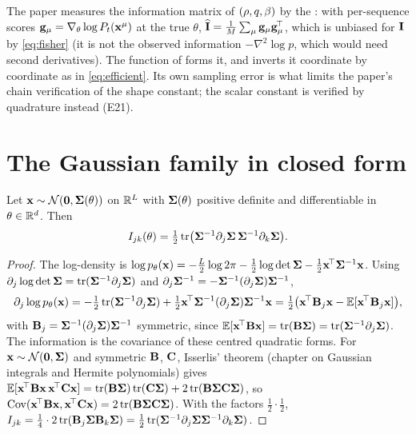 The paper measures the information matrix of $(\rho,q,\beta)$ by the
: with per-sequence scores $\mathbf{g}_\mu=\nabla_\theta\log P_t(\mathbf{x}^\mu)$
at the true $\theta$, $\widehat{\mathbf{I}}=\tfrac1{M}\sum_\mu\mathbf{g}_\mu\mathbf{g}_\mu^{\!\top}$,
which is unbiased for $\mathbf{I}$ by \cref{eq:fisher} (it is not the observed
information $-\nabla^2\log p$, which would need second derivatives). The function
 of  forms it,
and  inverts it coordinate by coordinate as in
\cref{eq:efficient}. Its own sampling error is what limits the paper's chain
verification of the shape constant; the scalar constant is verified by quadrature
instead (E21).

\section{The Gaussian family in closed form}
\label{sec:gaussian-fisher}

\begin{proposition}
\label{prop:gaussian-fisher}
Let $\mathbf{x}\sim\mathcal{N}\!\left(\mathbf{0},\mathbf{\Sigma}(\theta)\right)$ on $\mathbb{R}^{L}$ with $\mathbf{\Sigma}(\theta)$
positive definite and differentiable in $\theta\in\mathbb{R}^d$. Then
\begin{equation}
  I_{jk}(\theta)=\tfrac12\operatorname{tr}\bigl(\mathbf{\Sigma}^{-1}\partial_j\mathbf{\Sigma}\,\mathbf{\Sigma}^{-1}\partial_k\mathbf{\Sigma}\bigr).
  \label{eq:gaussian-fisher}
\end{equation}
\end{proposition}
\begin{proof}
The log-density is $\log p_\theta(\mathbf{x})=-\tfrac{L}2\log2\pi-\tfrac12\log\det\mathbf{\Sigma}-\tfrac12\mathbf{x}^{\!\top}\mathbf{\Sigma}^{-1}\mathbf{x}$.
Using $\partial_j\log\det\mathbf{\Sigma}=\operatorname{tr}(\mathbf{\Sigma}^{-1}\partial_j\mathbf{\Sigma})$ and $\partial_j\mathbf{\Sigma}^{-1}=-\mathbf{\Sigma}^{-1}(\partial_j\mathbf{\Sigma})\mathbf{\Sigma}^{-1}$,
\[
  \partial_j\log p_\theta(\mathbf{x})=-\tfrac12\operatorname{tr}(\mathbf{\Sigma}^{-1}\partial_j\mathbf{\Sigma})+\tfrac12\mathbf{x}^{\!\top}\mathbf{\Sigma}^{-1}(\partial_j\mathbf{\Sigma})\mathbf{\Sigma}^{-1}\mathbf{x}
  =\tfrac12\bigl(\mathbf{x}^{\!\top}\mathbf{B}_j\mathbf{x}-\mathbb{E}[\mathbf{x}^{\!\top}\mathbf{B}_j\mathbf{x}]\bigr),
\]
with $\mathbf{B}_j=\mathbf{\Sigma}^{-1}(\partial_j\mathbf{\Sigma})\mathbf{\Sigma}^{-1}$ symmetric, since $\mathbb{E}[\mathbf{x}^{\!\top}\mathbf{B}\mathbf{x}]=\operatorname{tr}(\mathbf{B}\mathbf{\Sigma})=\operatorname{tr}(\mathbf{\Sigma}^{-1}\partial_j\mathbf{\Sigma})$.
The information is the covariance of these centred quadratic forms. For
$\mathbf{x}\sim\mathcal{N}\!\left(\mathbf{0},\mathbf{\Sigma}\right)$ and symmetric $\mathbf{B}$, $\mathbf{C}$, Isserlis' theorem
(chapter on Gaussian integrals and Hermite polynomials) gives
$\mathbb{E}[\mathbf{x}^{\!\top}\mathbf{B}\mathbf{x}\,\mathbf{x}^{\!\top}\mathbf{C}\mathbf{x}]=\operatorname{tr}(\mathbf{B}\mathbf{\Sigma})\operatorname{tr}(\mathbf{C}\mathbf{\Sigma})+2\operatorname{tr}(\mathbf{B}\mathbf{\Sigma}\mathbf{C}\mathbf{\Sigma})$,
so $\operatorname{Cov}(\mathbf{x}^{\!\top}\mathbf{B}\mathbf{x},\mathbf{x}^{\!\top}\mathbf{C}\mathbf{x})=2\operatorname{tr}(\mathbf{B}\mathbf{\Sigma}\mathbf{C}\mathbf{\Sigma})$. With the factors
$\tfrac12\cdot\tfrac12$, $I_{jk}=\tfrac14\cdot2\operatorname{tr}(\mathbf{B}_j\mathbf{\Sigma}\mathbf{B}_k\mathbf{\Sigma})=\tfrac12\operatorname{tr}(\mathbf{\Sigma}^{-1}\partial_j\mathbf{\Sigma}\mathbf{\Sigma}^{-1}\partial_k\mathbf{\Sigma})$.
\end{proof}

